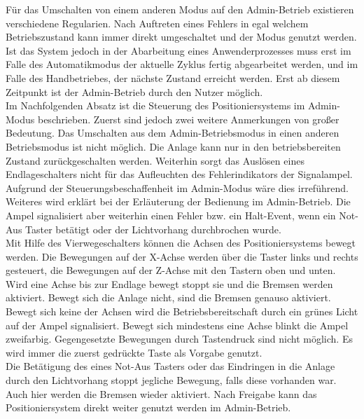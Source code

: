 \documentclass[../Bachelorarbeit.tex]{subfiles}
\begin{document}
Für das Umschalten von einem anderen Modus auf den Admin-Betrieb existieren verschiedene Regularien. Nach Auftreten eines Fehlers in egal welchem Betriebszustand kann immer direkt umgeschaltet und der Modus genutzt werden. Ist das System jedoch in der Abarbeitung eines Anwenderprozesses muss erst im Falle des Automatikmodus der aktuelle Zyklus fertig abgearbeitet werden, und im Falle des Handbetriebes, der nächste Zustand erreicht werden. Erst ab diesem Zeitpunkt ist der Admin-Betrieb durch den Nutzer möglich.\\
Im Nachfolgenden Absatz ist die Steuerung des Positioniersystems im Admin-Modus beschrieben. Zuerst sind jedoch zwei weitere Anmerkungen von großer Bedeutung. Das Umschalten aus dem Admin-Betriebsmodus in einen anderen Betriebsmodus ist nicht möglich. Die Anlage kann nur in den betriebsbereiten Zustand zurückgeschalten werden. Weiterhin sorgt das Auslösen eines Endlageschalters nicht für das Aufleuchten des Fehlerindikators der Signalampel. Aufgrund der Steuerungsbeschaffenheit im Admin-Modus wäre dies irreführend. Weiteres wird erklärt bei der Erläuterung der Bedienung im Admin-Betrieb. Die Ampel signalisiert aber weiterhin einen Fehler bzw. ein Halt-Event, wenn ein Not-Aus Taster betätigt oder der Lichtvorhang durchbrochen wurde.\\
Mit Hilfe des Vierwegeschalters können die Achsen des Positioniersystems bewegt werden. Die Bewegungen auf der X-Achse werden über die Taster links und rechts gesteuert, die Bewegungen auf der Z-Achse mit den Tastern oben und unten. Wird eine Achse bis zur Endlage bewegt stoppt sie und die Bremsen werden aktiviert. Bewegt sich die Anlage nicht, sind die Bremsen genauso aktiviert. Bewegt sich keine der Achsen wird die Betriebsbereitschaft durch ein grünes Licht auf der Ampel signalisiert. Bewegt sich mindestens eine Achse blinkt die Ampel zweifarbig. Gegengesetzte Bewegungen durch Tastendruck sind nicht möglich. Es wird immer die zuerst gedrückte Taste als Vorgabe genutzt.\\
Die Betätigung des eines Not-Aus Tasters oder das Eindringen in die Anlage durch den Lichtvorhang stoppt jegliche Bewegung, falls diese vorhanden war. Auch hier werden die Bremsen wieder aktiviert. Nach Freigabe kann das Positioniersystem direkt weiter genutzt werden im Admin-Betrieb.
\end{document}
